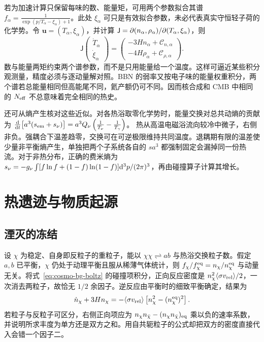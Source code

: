 若为加速计算只保留每味的数、能量矩，可用两个参数拟合其谱 $f_\alpha=\frac{1}{\exp(p/T_\alpha-\xi_\alpha)+1}$。此处 $\xi_\alpha$ 可只是有效拟合参数，未必代表真实守恒轻子荷的化学势。令 $\bm u=(T_\alpha,\xi_\alpha)$，并计算 $\mathsf J=\partial(n_\alpha,\rho_\alpha)/\partial(T_\alpha,\xi_\alpha)$，则
\[
 \mathsf J
 \begin{pmatrix}\dot T_\alpha\\ \dot\xi_\alpha\end{pmatrix}
 =
 \begin{pmatrix}
 -3Hn_\alpha+\mathcal C_{n,\alpha}\\
 -4H\rho_\alpha+\mathcal C_{\rho,\alpha}
 \end{pmatrix}.
\]
数与能量两矩约束两个谱参数，而不是只用能量给一个温度。这样可逼近某些积分观测量，精度必须与逐动量解对照。BBN 的弱率又按电子味的能量权重积分，两个谱若总能量相同但高能尾不同，氦产额仍可不同。因而核合成和 CMB 中相同的 $N_{\rm eff}$ 不总意味着完全相同的热史。

还可从熵产生核对这些近似。对各热浴取零化学势时，能量交换对总共动熵的贡献为 $\frac{\dd}{\dd t}\big[a^3(s_{\rm em}+s_\nu)\big] =a^3 Q_\nu\left(\frac1{T_\nu}-\frac1{T_\gamma}\right)$。
热从高温电磁浴流向较冷中微子，右侧非负。强耦合下温差趋零，交换可在可逆极限维持共同温度。退耦期有限的温差使少量非平衡熵产生，单独把两个子系统各自的 $sa^3$ 都强制固定会漏掉同一份热流。对于非热分布，正确的费米熵为 $s_\nu=-g_\nu\int[f\ln f+(1-f)\ln(1-f)]\dd^3p/(2\pi)^3$，再由碰撞算子计算其增长。

\section{热遗迹与物质起源}\label{sec:cosmo-relics}

\subsection{湮灭的冻结}

设 $\chi$ 为稳定、自身即反粒子的重粒子，能以 $\chi\chi\rightleftharpoons a b$ 与热浴交换粒子数。假定 $a,b$ 已平衡，$\chi$ 仍处于动理平衡且服从稀薄气体统计，则 $f_\chi/f_\chi^{\rm eq}=n_\chi/n_\chi^{\rm eq}$ 与动量无关。将式~\eqref{eq:cosmo-bg-boltz} 的碰撞项积分，正向反应密度是 $n_\chi^2\langle\sigma v_{\rm rel}\rangle/2$，一次消去两粒子，故恰无 $1/2$ 余因子。逆反应由平衡时的细致平衡确定，结果为
\begin{equation}\label{eq:cosmo-thermal-relic}
 \dot n_\chi+3H n_\chi=-\langle\sigma v_{\rm rel}\rangle
 \left[n_\chi^2-(n_\chi^{\rm eq})^2\right].
\end{equation}
若粒子与反粒子可区分，右侧正向项应为 $n_\chi n_{\bar\chi}-(n_\chi n_{\bar\chi})_{\rm eq}$ 乘以负的速率系数，并说明所求丰度为单方还是双方之和。用自共轭粒子的公式却把双方的密度直接代入会错一个因子二。

